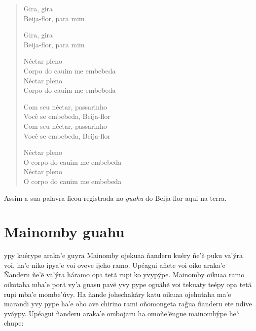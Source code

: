 \begin{verse}
Gira, gira\\
Beija-flor, para mim

Gira, gira\\
Beija-flor, para mim

Néctar pleno\\
Corpo\footnotemark{} do cauim me embebeda\footnotemark{}\\
Néctar pleno\\
Corpo do cauim me embebeda

Com seu néctar, passarinho\\
Você se embebeda, Beija-flor\\
Com seu néctar, passarinho\\
Você se embebeda, Beija-flor

Néctar pleno\\
O corpo do cauim me embebeda\\
Néctar pleno\\
O corpo do cauim me embebeda
\end{verse}



Assim a sua palavra ficou registrada no \textit{guahu} do Beija-flor aqui na terra.

\chapter{Mainomby guahu}

 ypy kuérype araka'e guyra Mainomby ojekuaa ñanderu kuéry ñe'ẽ puku
va'ýra voi, ha'e niko ipya'e voi oveve ijeho ramo. Upéagui añete voi
oiko araka'e Ñanderu ñe'ẽ va'ýra háramo opa tetã rupi ko yvypýpe.
Mainomby oikuaa ramo oikotaha mba'e porã vy'a guasu pavẽ yvy pype oguãhẽ
voi tekuaty teépy opa tetã rupi mba'e mombe'úvy. Ha ñande johechakáry
katu oikuaa ojehutaha ma'e marandi yvy pype ha'e oho ave chirino rami
oñomongeta rag̃ua ñanderu ete ndive yváypy. Upéagui ñanderu araka'e
ombojaru ha omoñe'ẽngue mainombýpe he'i chupe:

